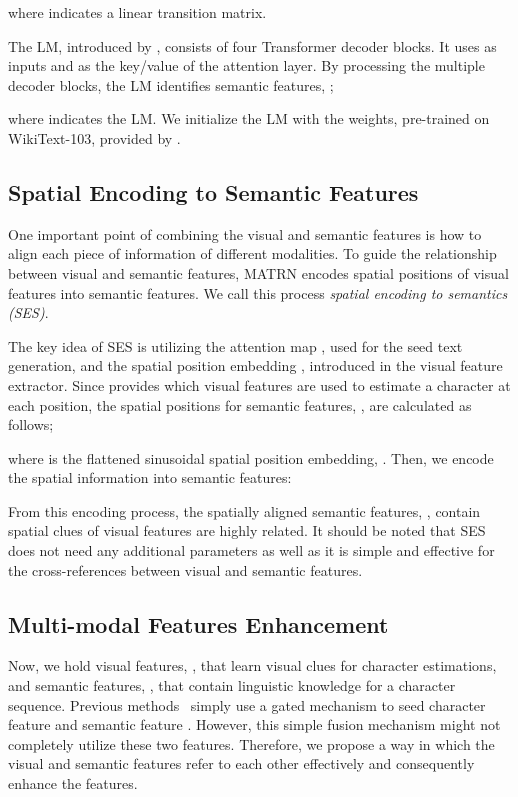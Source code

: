 \documentclass[runningheads]{llncs}
\begin{document}
where  indicates a linear transition matrix.

The LM, introduced by \cite{ABINet}, consists of four Transformer decoder blocks. 
It uses  as inputs and  as the key/value of the attention layer. By processing the multiple decoder blocks, the LM identifies semantic features, ;

where  indicates the LM. We initialize the LM with the weights, pre-trained on WikiText-103, provided by \cite{ABINet}.

\subsection{Spatial Encoding to Semantic Features}

One important point of combining the visual and semantic features is how to align each piece of information of different modalities. To guide the relationship between visual and semantic features, MATRN encodes spatial positions of visual features into semantic features. We call this process \emph{spatial encoding to semantics (SES)}. 

The key idea of SES is utilizing the attention map , used for the seed text generation, and the spatial position embedding , introduced in the visual feature extractor. Since  provides which visual features are used to estimate a character at each position, the spatial positions for semantic features, , are calculated as follows;

where  is the flattened sinusoidal spatial position embedding, . Then, we encode the spatial information into semantic features:

From this encoding process, the spatially aligned semantic features, , contain spatial clues of visual features are highly related. 
It should be noted that SES does not need any additional parameters as well as it is simple and effective for the cross-references between visual and semantic features. 


\subsection{Multi-modal Features Enhancement}

Now, we hold visual features, , that learn visual clues for character estimations, and semantic features, , that contain linguistic knowledge for a character sequence. Previous methods~\cite{Yu_2020_CVPR_SRN,ABINet} simply use a gated mechanism to seed character feature  and semantic feature . However, this simple fusion mechanism might not completely utilize these two features. Therefore, we propose a way in which the visual and semantic features refer to each other effectively and consequently enhance the features.
\end{document}
